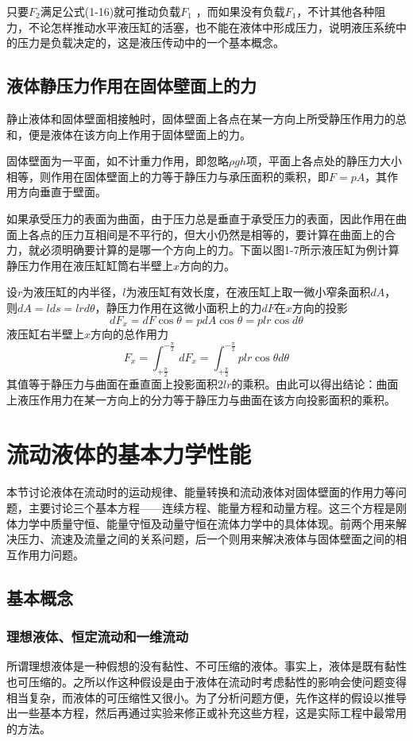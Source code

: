 只要$F_2$满足公式(1-16)就可推动负载$F_1$ ，而如果没有负载$F_1$，不计其他各种阻力，不论怎样推动水平液压缸的活塞，也不能在液体中形成压力，说明液压系统中的压力是负载决定的，这是液压传动中的一个基本概念。

\section{液体静压力作用在固体壁面上的力}
静止液体和固体壁面相接触时，固体壁面上各点在某一方向上所受静压作用力的总和，便是液体在该方向上作用于固体壁面上的力。

固体壁面为一平面，如不计重力作用，即忽略$\rho gh$项，平面上各点处的静压力大小相等，则作用在固体壁面上的力等于静压力与承压面积的乘积，即$F=pA$，其作用方向垂直于壁面。

如果承受压力的表面为曲面，由于压力总是垂直于承受压力的表面，因此作用在曲面上各点的压力互相间是不平行的，但大小仍然是相等的，要计算在曲面上的合力，就必须明确要计算的是哪一个方向上的力。下面以图1-7所示液压缸为例计算静压力作用在液压缸缸筒右半壁上$x$方向的力。

设$r$为液压缸的内半径，$l$为液压缸有效长度，在液压缸上取一微小窄条面积$dA$，则$dA=lds=lrd\theta$，静压力作用在这微小面积上的力$dF$在$x$方向的投影
$$dF_x=dF\cos \theta=pdA\cos \theta=plr\cos d\theta$$
液压缸右半壁上$x$方向的总作用力
$$F_x=\int_{+\frac{\pi}{2}}^{-\frac{\pi}{2}}  \,dF_x=\int_{+\frac{\pi}{2}}^{-\frac{\pi}{2}}  plr\cos \theta d\theta$$
其值等于静压力与曲面在垂直面上投影面积$2lr$的乘积。由此可以得出结论：曲面上液压作用力在某一方向上的分力等于静压力与曲面在该方向投影面积的乘积。


\chapter{流动液体的基本力学性能}
本节讨论液体在流动时的运动规律、能量转换和流动液体对固体壁面的作用力等问题，主要讨论三个基本方程——连续方程、能量方程和动量方程。这三个方程是刚体力学中质量守恒、能量守恒及动量守恒在流体力学中的具体体现。前两个用来解决压力、流速及流量之间的关系问题，后一个则用来解决液体与固体壁面之间的相互作用力问题。
\section{基本概念}
\subsection{理想液体、恒定流动和一维流动}
所谓理想液体是一种假想的没有黏性、不可压缩的液体。事实上，液体是既有黏性也可压缩的。之所以作这种假设是由于液体在流动时考虑黏性的影响会使问题变得相当复杂，而液体的可压缩性又很小。为了分析问题方便，先作这样的假设以推导出一些基本方程，然后再通过实验来修正或补充这些方程，这是实际工程中最常用的方法。

